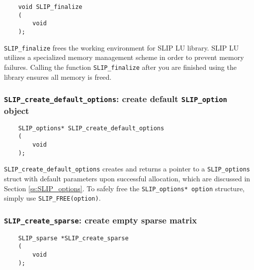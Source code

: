 \documentclass[11pt]{article}
\theoremstyle{definition}
\begin{document}
\begin{mdframed}[userdefinedwidth=6in]
{\footnotesize
\begin{verbatim}
    void SLIP_finalize
    (
        void
    );
\end{verbatim}
} \end{mdframed}

\verb|SLIP_finalize| frees the working environment for SLIP LU library. SLIP LU
utilizes a specialized memory management scheme in order to prevent memory
failures. Calling the function \verb|SLIP_finalize| after you are finished
using the library ensures all memory is freed.

\cprotect\subsubsection{\verb|SLIP_create_default_options|: create default \verb|SLIP_option| object}
\label{ss:create_default_options}

\begin{mdframed}[userdefinedwidth=6in]
{\footnotesize
\begin{verbatim}
    SLIP_options* SLIP_create_default_options
    (
        void
    );
\end{verbatim}
} \end{mdframed}

\verb|SLIP_create_default_options| creates and returns a pointer to a
\verb|SLIP_options| struct with default parameters upon successful allocation,
which are discussed in Section \ref{ss:SLIP_options}.  To safely free the
\verb|SLIP_options* option| structure, simply use \verb|SLIP_FREE(option)|.

\cprotect\subsubsection{\verb|SLIP_create_sparse|: create empty sparse matrix}
\label{ss:create_sparse}

\begin{mdframed}[userdefinedwidth=6in]
{\footnotesize
\begin{verbatim}
    SLIP_sparse *SLIP_create_sparse
    (
        void
    );
\end{verbatim}
} \end{mdframed}
\end{document}

